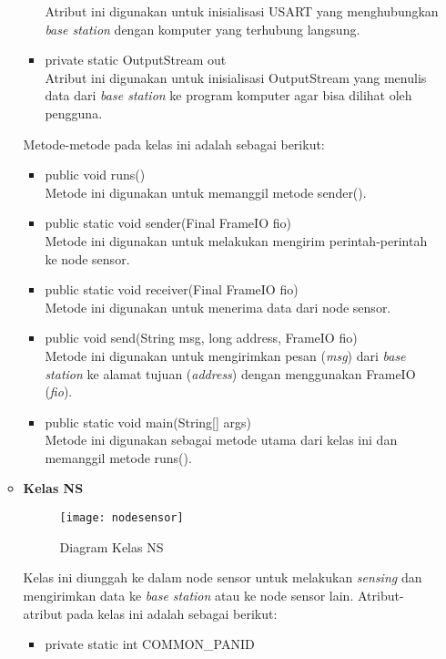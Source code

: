 \begin{itemize}
\begin{itemize}
\begin{itemize}
            Atribut ini digunakan untuk inisialisasi USART yang menghubungkan \textit{base station} dengan komputer yang terhubung langsung.
            \item private static OutputStream out\\
            Atribut ini digunakan untuk inisialisasi OutputStream yang menulis data dari \textit{base station} ke program komputer agar bisa dilihat oleh pengguna.
        \end{itemize}
        Metode-metode pada kelas ini adalah sebagai berikut:
        \begin{itemize}
            \item public void runs()\\
            Metode ini digunakan untuk memanggil metode sender().
            \item public static void sender(Final FrameIO fio)\\
            Metode ini digunakan untuk melakukan mengirim perintah-perintah ke node sensor.
            \item public static void receiver(Final FrameIO fio)\\
            Metode ini digunakan untuk menerima data dari node sensor. 
            \item public void send(String msg, long address, FrameIO fio)\\
            Metode ini digunakan untuk mengirimkan pesan (\textit{msg}) dari \textit{base station} ke alamat tujuan (\textit{address}) dengan menggunakan FrameIO (\textit{fio}).
            \item public static void main(String[] args)\\
            Metode ini digunakan sebagai metode utama dari kelas ini dan memanggil metode runs().
        \end{itemize}
        \item \textbf{Kelas NS}\\
        \begin{figure}[htbp]
        	\centering
        	\texttt{[image: nodesensor]}
        	\caption{Diagram Kelas NS}
        	\label{fig:nodesensor}
        \end{figure}
        Kelas ini diunggah ke dalam node sensor untuk melakukan \textit{sensing} dan mengirimkan data ke \textit{base station} atau ke node sensor lain. Atribut-atribut pada kelas ini adalah sebagai berikut:
        \begin{itemize}
            \item private static int COMMON\_PANID\\

\end{itemize}
\end{itemize}
\end{itemize}
